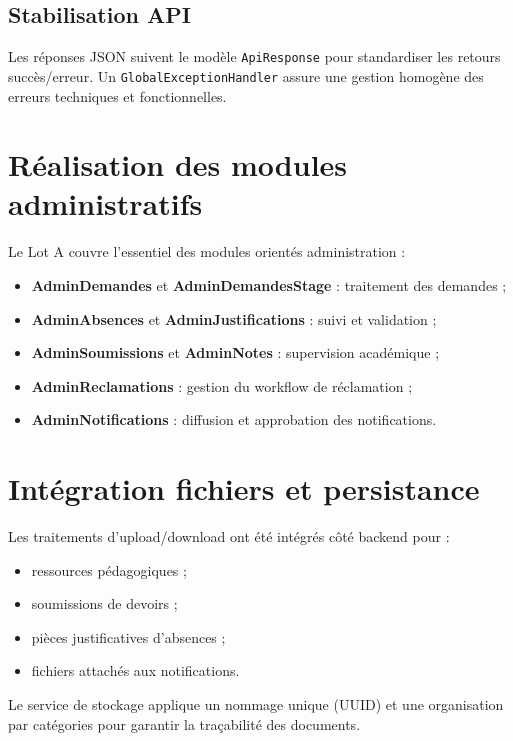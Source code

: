 \subsection{Stabilisation API}

Les réponses JSON suivent le modèle \texttt{ApiResponse} pour standardiser les retours succès/erreur. Un \texttt{GlobalExceptionHandler} assure une gestion homogène des erreurs techniques et fonctionnelles.

\section{Réalisation des modules administratifs}

Le Lot A couvre l'essentiel des modules orientés administration :
\begin{itemize}[noitemsep]
    \item \textbf{AdminDemandes} et \textbf{AdminDemandesStage} : traitement des demandes ;
    \item \textbf{AdminAbsences} et \textbf{AdminJustifications} : suivi et validation ;
    \item \textbf{AdminSoumissions} et \textbf{AdminNotes} : supervision académique ;
    \item \textbf{AdminReclamations} : gestion du workflow de réclamation ;
    \item \textbf{AdminNotifications} : diffusion et approbation des notifications.
\end{itemize}

\section{Intégration fichiers et persistance}

Les traitements d'upload/download ont été intégrés côté backend pour :
\begin{itemize}[noitemsep]
    \item ressources pédagogiques ;
    \item soumissions de devoirs ;
    \item pièces justificatives d'absences ;
    \item fichiers attachés aux notifications.
\end{itemize}

Le service de stockage applique un nommage unique (UUID) et une organisation par catégories pour garantir la traçabilité des documents.

